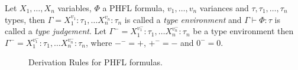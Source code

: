 \begin{definition}
    Let $X_1, \dots, X_n$ variables, $\Phi$ a PHFL formula, $v_1, \dots, v_n$ variances and $\tau, \tau_1, \dots,
    \tau_n$ types, then $\Gamma = X_1^{v_1}\colon \tau_1, \dots X_n^{v_n} \colon \tau_n$ is
    called a \emph{type environment} and $\Gamma \vdash \Phi\colon\tau$
    is called a \emph{type judgement}. Let $\Gamma^- = X_1^{v_1^-}\colon \tau_1, \dots
    X_n^{v_n^-} \colon \tau_n$ be a type environment then $\Gamma^- = X_1^{v_1^-}\colon \tau_1, \dots
    X_n^{v_n^-} \colon \tau_n$, where $-^- = +$, $+^- = -$ and $0^- = 0$.
\end{definition}

\begin{figure}[!t]
    \caption{Derivation Rules for PHFL formulas.}
    \label{figure:phfl-typing-rules}
\end{figure}

